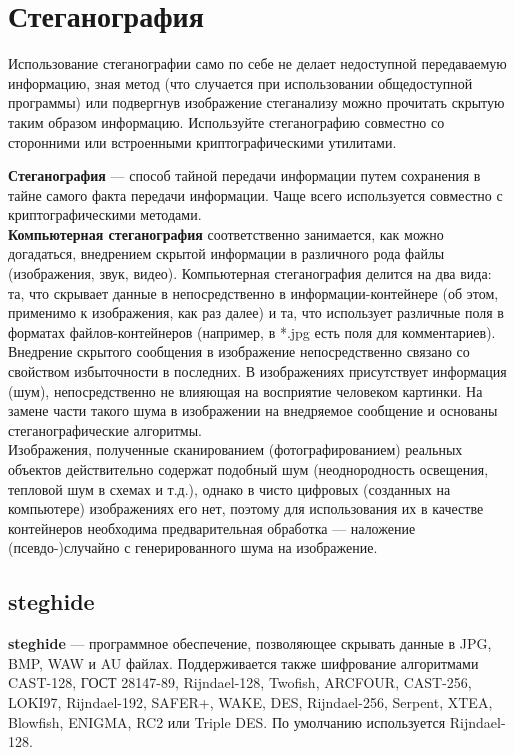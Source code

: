 \section{Стеганография}
\begin{important}
Использование стеганографии само по себе не делает недоступной передаваемую информацию, зная метод (что случается при использовании общедоступной программы) или подвергнув изображение стеганализу можно прочитать скрытую таким образом информацию. Используйте стеганографию совместно со сторонними или встроенными криптографическими утилитами.
\end{important}
\textbf{Стеганография} --- способ тайной передачи информации путем сохранения в тайне самого факта передачи информации. Чаще всего используется совместно с криптографическими методами.\\
\textbf{Компьютерная стеганография} соответственно занимается, как можно догадаться, внедрением скрытой информации в различного рода файлы (изображения, звук, видео). Компьютерная стеганография делится на два вида: та, что скрывает данные в непосредственно в информации-контейнере (об этом, применимо к изображения, как раз далее) и та, что использует различные поля в форматах файлов-контейнеров (например, в *.jpg есть поля для комментариев).\\
Внедрение скрытого сообщения в изображение непосредственно связано со свойством избыточности в последних. В изображениях присутствует информация (шум), непосредственно не влияющая на восприятие человеком картинки. На замене части такого шума в изображении на внедряемое сообщение и основаны стеганографические алгоритмы.\\
Изображения, полученные сканированием (фотографированием) реальных объектов действительно содержат подобный шум (неоднородность освещения, тепловой шум в схемах и т.д.), однако в чисто цифровых (созданных на компьютере) изображениях его нет, поэтому для использования их в качестве контейнеров необходима предварительная обработка --- наложение (псевдо-)случайно с генерированного шума на изображение.
\subsection{steghide}
\textbf{steghide} --- программное обеспечение, позволяющее скрывать данные в JPG, BMP, WAW и AU файлах. Поддерживается также шифрование алгоритмами CAST-128, ГОСТ 28147-89, Rijndael-128, Twofish, ARCFOUR, CAST-256, LOKI97, Rijndael-192, SAFER+, WAKE, DES, Rijndael-256, Serpent, XTEA, Blowfish, ENIGMA, RC2 или Triple DES. По умолчанию используется Rijndael-128.
